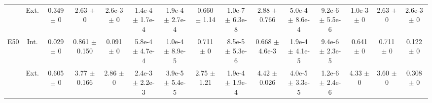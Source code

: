 \begin{table}[htbp]
{\begin{tabular}{@{}ccccccccccccccc@{}}
 & Ext. & 0.349 $\pm$ 0 & 2.63 $\pm$ 0 & 2.6e-3 $\pm$ 0 & 1.4e-4 $\pm$ 1.7e-4 & 1.9e-4 $\pm$ 2.7e-4 & 0.660 $\pm$ 1.14 & 1.0e-7 $\pm$ 6.3e-8 & 2.88 $\pm$ 0.766 & 5.0e-4 $\pm$ 8.6e-4 & 9.2e-6 $\pm$ 5.5e-6 & 1.0e-3 $\pm$ 0 & 2.63 $\pm$ 0 & 2.6e-3 $\pm$ 0 \\
\cline{2-15}
\multirow{2}{*}{E50} & Int. & 0.029 $\pm$ 0 & 0.861 $\pm$ 0.150 & 0.091 $\pm$ 0 & 5.8e-4 $\pm$ 4.7e-4 & 1.0e-4 $\pm$ 8.9e-5 & 0.711 $\pm$ 0 & 8.5e-5 $\pm$ 5.3e-6 & 0.668 $\pm$ 4.6e-3 & 1.9e-4 $\pm$ 4.1e-5 & 9.4e-6 $\pm$ 2.3e-5 & 0.641 $\pm$ 0 & 0.711 $\pm$ 0 & 0.122 $\pm$ 0 \\
 & Ext. & 0.605 $\pm$ 0 & 3.77 $\pm$ 0.166 & 2.86 $\pm$ 0 & 2.4e-3 $\pm$ 2.2e-3 & 3.9e-5 $\pm$ 5.4e-5 & 2.75 $\pm$ 1.21 & 1.9e-4 $\pm$ 1.9e-4 & 4.42 $\pm$ 0.026 & 4.0e-5 $\pm$ 3.3e-5 & 1.2e-6 $\pm$ 2.4e-6 & 4.33 $\pm$ 0 & 3.60 $\pm$ 0 & 0.308 $\pm$ 0 \\
\bottomrule
\end{tabular}
}
\end{table}